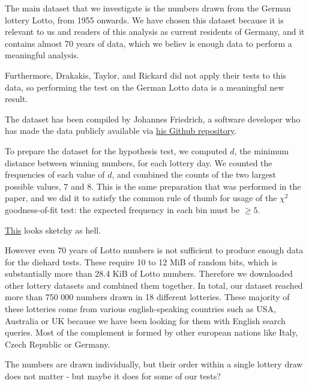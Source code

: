 The main dataset that we investigate is the numbers drawn from the German lottery Lotto, from 1955 onwards. 
We have chosen this dataset because it is relevant to us and readers of this analysis as current residents of Germany, 
and it contains almost 70 years of data, which we believ is enough data to perform a meaningful analysis.

Furthermore, Drakakis, Taylor, and Rickard did not apply their tests to this data, so 
performing the test on the German Lotto data is a meaningful new result.

The dataset has been compiled by Johannes Friedrich, 
a software developer who has made the data publicly available via 
\href{https://github.com/JohannesFriedrich/LottoNumberArchive}{his Github repository}.


To prepare the dataset for the hypothesis test, we computed $d$, the minimum distance between winning numbers, for each 
lottery day. We counted the frequencies of each value of $d$, and combined the counts of the 
two largest possible values, $7$ and $8$. This is the same preparation that was performed in the paper,
and we did it to satisfy the common rule of thumb for usage of the 
$\chi^2$ goodness-of-fit test: the expected frequency in each bin must be $\geq 5$.


 \href{https://notebook.community/JesseScott/Lotto649/lotto}{This} looks sketchy as hell.

However even 70 years of Lotto numbers is not sufficient to produce enough data for the diehard tests. These require 10 to 12 MiB of random bits, which is
substantially more than 28.4 KiB of Lotto numbers. Therefore we downloaded other lottery datasets and combined them together. In total, our dataset reached
more than 750 000 numbers drawn in 18 different lotteries. These majority of these lotteries come from various english-speaking countries such as USA,
Australia or UK because we have been looking for them with English search queries. Most of the complement is formed by other european nations like Italy,
Czech Republic or Germany.


The numbers are drawn individually, but their order within a single lottery draw does not matter - but maybe it does for some of our tests?

